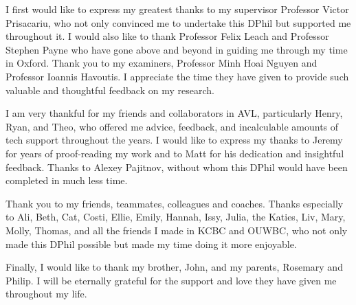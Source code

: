 \documentclass[../thesis.tex]{subfiles}
\begin{document}
\begin{acknowledgements}
I first would like to express my greatest thanks to my supervisor Professor Victor Prisacariu, who not only convinced me to undertake this DPhil but supported me throughout it.
I would also like to thank Professor Felix Leach and Professor Stephen Payne who have gone above and beyond in guiding me through my time in Oxford.
Thank you to my examiners, Professor Minh Hoai Nguyen and Professor Ioannis Havoutis. I appreciate the time they have given to provide such valuable and thoughtful feedback on my research.

I am very thankful for my friends and collaborators in AVL, particularly Henry, Ryan, and Theo, who offered me advice, feedback, and incalculable amounts of tech support throughout the years. 
I would like to express my thanks to Jeremy for years of proof-reading my work and to Matt for his dedication and insightful feedback.
Thanks to Alexey Pajitnov, without whom this DPhil would have been completed in much less time.


Thank you to my friends, teammates, colleagues and coaches.
Thanks especially to Ali, Beth, Cat, Costi, Ellie, Emily, Hannah, Issy, Julia, the Katies, Liv, Mary, Molly, Thomas, and all the friends I made in KCBC and OUWBC,
who not only made this DPhil possible but made my time doing it more enjoyable.

Finally, I would like to thank my brother, John, and my parents, Rosemary and Philip.
I will be eternally grateful for the support and love they have given me throughout my life.


\end{acknowledgements}
\end{document}
